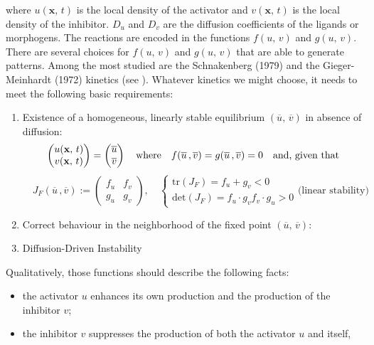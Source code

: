 where $u(\mathbf{x},\, t)$ is the local density of the activator and $v(\mathbf{x},\, t)$ is the local density of the inhibitor. $D_u$  and $D_v$ are the diffusion coefficients of the ligands or morphogens. The reactions are encoded in the functions $f(u,\,v)$ and $g(u,\,v)$. There are several choices for $f(u,\,v)$ and $g(u,\,v)$ that are able to generate patterns. Among the most studied are the Schnakenberg (1979) and the Gieger-Meinhardt (1972) kinetics (see \citep{murray}).
Whatever kinetics we might choose, it needs to meet the following basic requirements:
\begin{enumerate}
	\item Existence of a homogeneous, linearly stable equilibrium $(\overline{u},\, \overline{v})$ in absence of diffusion:
		$$
		\centering
		\begin{pmatrix}
			u(\mathbf{x},\, t) \\
			v(\mathbf{x},\, t)
		\end{pmatrix} = 
		\begin{pmatrix}
			\overline{u} \\
			\overline{v}
		\end{pmatrix}
		\quad \text{where} \quad f(\overline{u}\,, \overline{v}) = g(\overline{u}\,, \overline{v})=0 \quad \text{and, given that}
		$$
		$$
		 \quad J_{F}(\overline{u}\,, \overline{v}) := 
		\begin{pmatrix}
 			f_u & f_v \\
 			g_u & g_v
 		\end{pmatrix}, \quad
 		\begin{cases}
 			\text{tr}(J_F)= f_u + g_v < 0\\
 			\text{det}(J_F) = f_u\cdot g_v f_v\cdot g_u>0
 		\end{cases}
		\text{(linear stability)}
		$$
	\item Correct behaviour in the neighborhood of the fixed point $(\overline{u},\, \overline{v})$:
	\item Diffusion-Driven Instability
\end{enumerate}
 Qualitatively, those functions should describe the following facts:
\begin{itemize}
    \item the activator $u$ enhances its own production and the production of the inhibitor $v$;
    \item the inhibitor $v$ suppresses the production of both the activator $u$ and itself,
\end{itemize}

